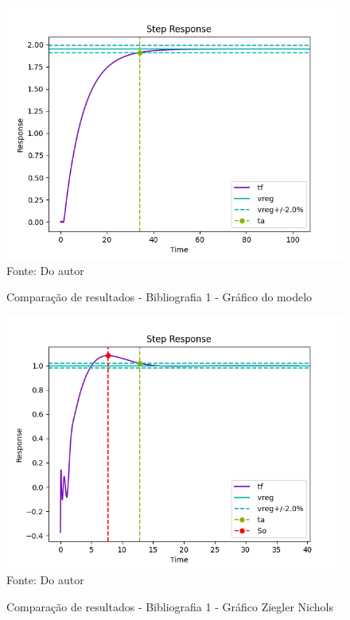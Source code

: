 \begin{figure}[H]
    \centering
    \caption{Comparação de resultados - Bibliografia 1 - Gráfico do modelo}
    \includegraphics[scale=0.8]{figuras/bib_comp_1_code1_out_fig1}
    \label{fig:bib_comp_1_code1_out_fig1}
    \\
    \vspace{0cm}\hspace{0cm}\small{Fonte: Do autor}
\end{figure}
\begin{figure}[H]
    \centering
    \caption{Comparação de resultados - Bibliografia 1 - Gráfico Ziegler Nichols}
    \includegraphics[scale=0.8]{figuras/bib_comp_1_code1_out_fig2}
    \label{fig:bib_comp_1_code1_out_fig2}
    \\
    \vspace{0cm}\hspace{0cm}\small{Fonte: Do autor}
\end{figure}
